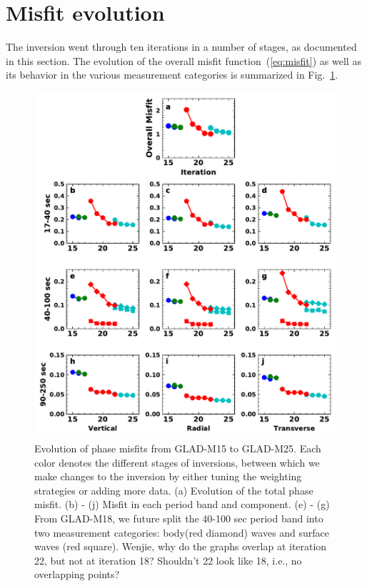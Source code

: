\documentclass[extra,mreferee]{gji}
\begin{document}
\section{Misfit evolution}

The inversion went through ten iterations in a number of stages, as documented in this section.
The evolution of the overall misfit function~(\ref{eq:misfit}) as well as its behavior in the various measurement categories is summarized in Fig.~\ref{fig:misfit}.

\begin{figure}
  \centering
  \includegraphics[width=\textwidth]{figures/misfit.pdf}
  \caption{Evolution of phase misfits from GLAD-M15 to GLAD-M25.
  Each color denotes the different stages of inversions, between
  which we make changes to the inversion by either tuning the
  weighting strategies or adding more data.
  (a) Evolution of the total phase misfit. (b) - (j) Misfit in
  each period band and component. (e) - (g) From GLAD-M18,
  we future split the 40-100 sec period band into two
  measurement categories: body(red diamond) waves and surface waves
  (red square).
  {\color{red} Wenjie, why do the graphs overlap at iteration 22, but not at iteration 18? Shouldn't 22 look like 18, i.e., no overlapping points?}
  }
  \label{fig:misfit}
\end{figure}
\end{document}
